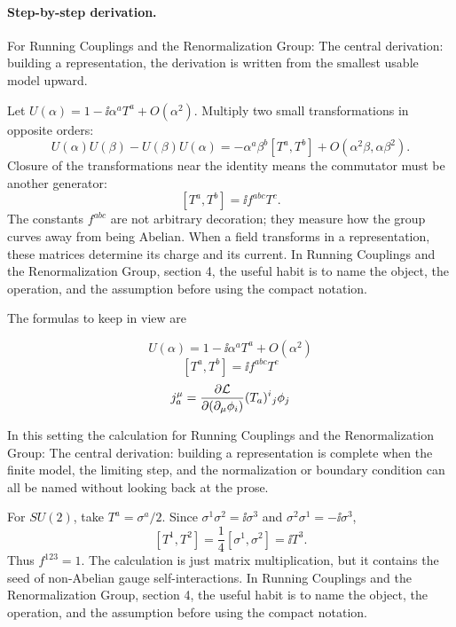 \paragraph{Step-by-step derivation.}

For Running Couplings and the Renormalization Group: The central derivation: building a representation, the derivation is written from the smallest usable model upward.

Let \(U(\alpha)=1-\ii\alpha^aT^a+O(\alpha^2)\).  Multiply two small transformations in opposite orders:
\[
  U(\alpha)U(\beta)-U(\beta)U(\alpha)
  =
  -\alpha^a\beta^b[T^a,T^b]+O(\alpha^2\beta,\alpha\beta^2).
\]
Closure of the transformations near the identity means the commutator must be another generator:
\[
  [T^a,T^b]=\ii f^{abc}T^c.
\]
The constants \(f^{abc}\) are not arbitrary decoration; they measure how the group curves away from being Abelian.  When a field transforms in a representation, these matrices determine its charge and its current.  In Running Couplings and the Renormalization Group, section 4, the useful habit is to name the object, the operation, and the assumption before using the compact notation.

The formulas to keep in view are

\[
  U(\alpha)=1-\ii\alpha^aT^a+O(\alpha^2)
\]
\[
  [T^a,T^b]=\ii f^{abc}T^c
\]
\[
  j^\mu_a=\frac{\partial\mathcal L}{\partial(\partial_\mu\phi_i)}(T_a)^i{}_j\phi_j
\]

In this setting the calculation for Running Couplings and the Renormalization Group: The central derivation: building a representation is complete when the finite model, the limiting step, and the normalization or boundary condition can all be named without looking back at the prose.




\begin{example}
For \(SU(2)\), take \(T^a=\sigma^a/2\).  Since \(\sigma^1\sigma^2=\ii\sigma^3\) and \(\sigma^2\sigma^1=-\ii\sigma^3\),
\[
  [T^1,T^2]=\frac14[\sigma^1,\sigma^2]=\ii T^3.
\]
Thus \(f^{123}=1\).  The calculation is just matrix multiplication, but it contains the seed of non-Abelian gauge self-interactions.  In Running Couplings and the Renormalization Group, section 4, the useful habit is to name the object, the operation, and the assumption before using the compact notation.
\end{example}



